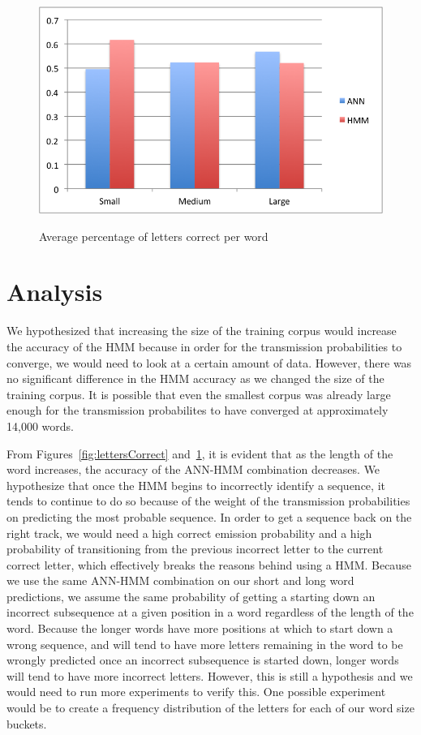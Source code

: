 \documentclass[11pt,a4paper,twocolumn]{article}
\begin{document}
\begin{figure}[h]
\centering
\caption{Average percentage of letters correct per word}
\includegraphics[scale=0.55]{img/wordCorrectness.png}
\label{fig:lettersCorrectPerWord}
\end{figure}


\section{Analysis}

We hypothesized that increasing the size of the training corpus would increase the accuracy of the
HMM because in order for the transmission probabilities to converge, we would need to look at a
certain amount of data. However, there was no significant difference in the HMM accuracy as we
changed the size of the training corpus. It is possible that even the smallest corpus was already
large enough for the transmission probabilites to have converged at approximately 14,000 words.

From Figures~\ref{fig:lettersCorrect} and~\ref{fig:lettersCorrectPerWord}, it is evident that as the length of the word increases, the accuracy of the
ANN-HMM combination decreases. We hypothesize that once the HMM begins to incorrectly identify a
sequence, it tends to continue to do so because of the weight of the transmission probabilities on
predicting the most probable sequence. In order to get a sequence back on the right track, we would
need a high correct emission probability and a high probability of transitioning from the previous
incorrect letter to the current correct letter, which effectively breaks the reasons behind using a
HMM\@. Because we use the same ANN-HMM combination on our short and long word predictions, we assume
the same probability of getting a starting down an incorrect subsequence at a given position in a
word regardless of the length of the word. Because the longer words have more positions at which to
start down a wrong sequence, and will tend to have more letters remaining in the word to be wrongly
predicted once an incorrect subsequence is started down, longer words will tend to have more
incorrect letters. However, this is still a hypothesis and we would need to run more
experiments to verify this. One possible experiment would be to create a frequency distribution of the letters for each of our word size buckets.
\end{document}
